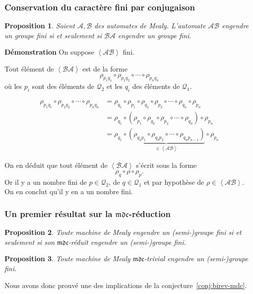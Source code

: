 \documentclass[11pt]{beamer}
\newtheorem{prop}{Proposition}
\begin{document}
\begin{frame}
  \frametitle{Conservation du caractère fini par conjugaison}

  \begin{prop} %
    Soient $\mathcal{A}, \mathcal{B}$ des automates de Mealy.
    L'automate $\mathcal{A}\mathcal{B}$ engendre un groupe fini si et seulement si $\mathcal{B}\mathcal{A}$ engendre un groupe fini.
  \end{prop}

  \textbf{Démonstration}
  On suppose $\left<\mathcal{A}\mathcal{B}\right>$ fini.

  Tout élément de $\left<\mathcal{B}\mathcal{A}\right>$ est de la forme
  \[
    \rho_{p_1q_1}\circ\rho_{p_2q_2}\circ\cdots\circ\rho_{p_nq_n}
  \]
  où les $p_i$ sont des éléments de $\mathcal{Q}_2$ et les $q_i$ des éléments de $\mathcal{Q}_1$.
\end{frame}

\begin{frame}
  \begin{align*}
    \rho_{p_1q_1}\circ\rho_{p_2q_2}\circ\cdots\circ\rho_{p_nq_n} &= \rho_{q_1}\circ\rho_{p_1}\circ\rho_{q_2}\circ\rho_{p_2}\circ\cdots\circ\rho_{q_n}\circ\rho_{p_n} \\
    &=\rho_{q_1}\circ\left(\rho_{p_1}\circ\rho_{q_2}\circ\rho_{p_2}\circ\cdots\circ\rho_{q_n}\right)\circ\rho_{p_n} \\
    &=\rho_{q_1}\circ\underbrace{\left(\rho_{q_2p_1}\circ\rho_{q_3p_2}\circ\cdots\circ\rho_{q_np_{n-1}}\right)}_{\in\left<\mathcal{A}\mathcal{B}\right>}\circ\rho_{p_n}
  \end{align*}

  On en déduit que tout élément de $\left<\mathcal{B}\mathcal{A}\right>$ s'écrit sous la forme
  \[ \rho_q\circ\rho\circ\rho_p. \] Or il y a un nombre fini de $p\in\mathcal{Q}_2$, de $q\in\mathcal{Q}_1$ et par hypothèse de $\rho\in\left<\mathcal{AB}\right>$. On en conclut qu'il y en a un nombre fini.

\end{frame}

\begin{frame}
  \frametitle{Un premier résultat sur la $\mathfrak{mdc}$-réduction}
  \begin{prop}
    Toute machine de Mealy engendre un (semi-)groupe fini si et seulement si son $\mathfrak{mdc}$-réduit engendre un (semi-)groupe fini.
  \end{prop}

  \begin{prop}
    Toute machine de Mealy $\mathfrak{mdc}$-trivial engendre un (semi-)groupe fini.
  \end{prop}

  Nous avons donc prouvé une des implications de la conjecture~\ref{conj:birev-mdc}.
\end{frame}
\end{document}
